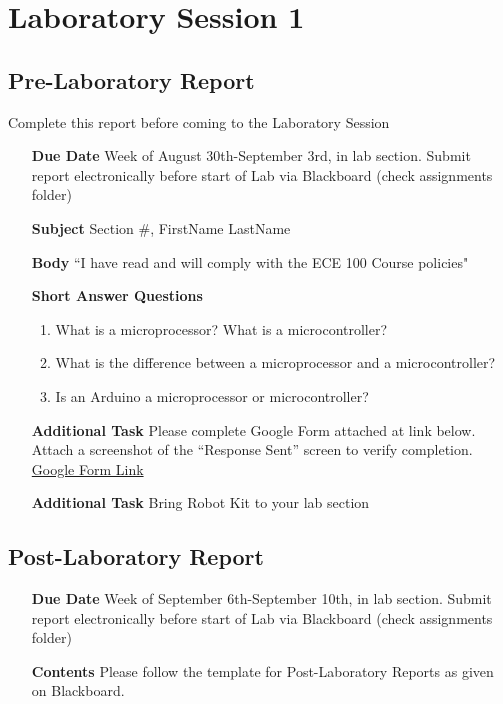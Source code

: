 \documentclass[]{report}
\begin{document}
\chapter{Laboratory Session 1}
\section{Pre-Laboratory Report}
Complete this report before coming to the Laboratory Session

\begin{itemize}
	
	\item[\textbf{Due Date}]{Week of August 30th-September 3rd, \the\year \space in lab section. Submit report electronically before start of Lab via Blackboard (check assignments folder)}
	\item[\textbf{Subject}]{Section \#, FirstName LastName}
	\item[\textbf{Body}]{``I have read and will comply with the ECE 100 Course policies"}
	\item[\textbf{Short Answer Questions}]{
		\begin{enumerate}
			\item{What is a microprocessor? What is a microcontroller?}
			\item{What is the difference between a microprocessor and a microcontroller?}
			\item{Is an Arduino a microprocessor or microcontroller?}
		\end{enumerate}
	}
	\item[\textbf{Additional Task}]{Please complete Google Form attached at link below. Attach a screenshot of the “Response Sent” screen to verify completion. \href{https://docs.google.com/forms/d/1YDT2DtzWYms2BeuS1Wrks3ZANfYgNUmNhEl2PUm63Qc/prefill}{Google Form Link}}
	\item[\textbf{Additional Task}]{Bring Robot Kit to your lab section}
\end{itemize}

\section{Post-Laboratory Report}

\begin{itemize}
	\item[\textbf{Due Date}]{Week of September 6th-September 10th, \the\year \space in lab section. Submit report electronically before start of Lab via Blackboard (check assignments folder)}
	\item[\textbf{Contents}]{Please follow the template for Post-Laboratory Reports as given on Blackboard.}
\end{itemize}
\end{document}
